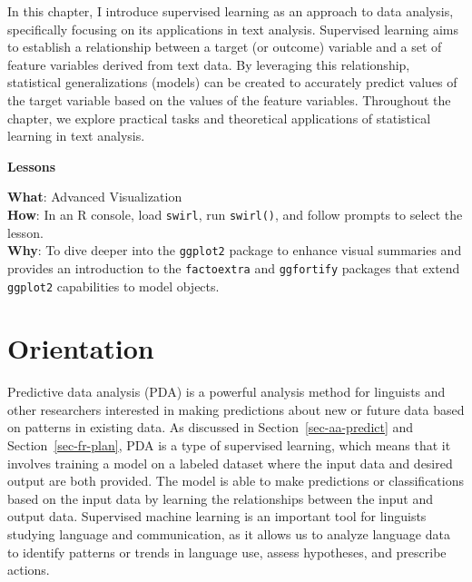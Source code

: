 \documentclass[
  letterpaper,
]{latex/krantz}
\theoremstyle{definition}
\theoremstyle{remark}
\begin{document}
In this chapter, I introduce supervised learning as an approach to data
analysis, specifically focusing on its applications in text analysis.
Supervised learning aims to establish a relationship between a target
(or outcome) variable and a set of feature variables derived from text
data. By leveraging this relationship, statistical generalizations
(models) can be created to accurately predict values of the target
variable based on the values of the feature variables. Throughout the
chapter, we explore practical tasks and theoretical applications of
statistical learning in text analysis.

\begin{tcolorbox}[enhanced jigsaw, breakable, leftrule=.75mm, arc=.35mm, colframe=quarto-callout-color-frame, colback=white, left=2mm, bottomrule=.15mm, rightrule=.15mm, toprule=.15mm, opacityback=0]

\textbf{ Lessons}

\textbf{What}: Advanced Visualization\\
\textbf{How}: In an R console, load \texttt{swirl}, run
\texttt{swirl()}, and follow prompts to select the lesson.\\
\textbf{Why}: To dive deeper into the \texttt{ggplot2} package to
enhance visual summaries and provides an introduction to the
\texttt{factoextra} and \texttt{ggfortify} packages that extend
\texttt{ggplot2} capabilities to model objects.

\end{tcolorbox}

\section{Orientation}\label{sec-pda-orientation}

Predictive data analysis (PDA) is a powerful analysis method for
linguists and other researchers interested in making predictions about
new or future data based on patterns in existing data. As discussed in
Section~\ref{sec-aa-predict} and Section~\ref{sec-fr-plan}, PDA is a
type of supervised learning, which means that it involves training a
model on a labeled dataset where the input data and desired output are
both provided. The model is able to make predictions or classifications
based on the input data by learning the relationships between the input
and output data. Supervised machine learning is an important tool for
linguists studying language and communication, as it allows us to
analyze language data to identify patterns or trends in language use,
assess hypotheses, and prescribe actions.
\end{document}
